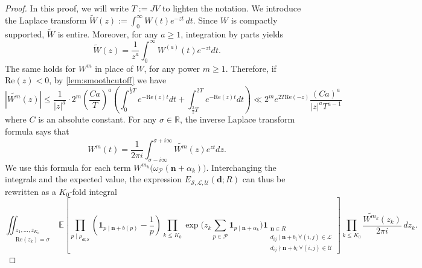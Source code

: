 \documentclass[11pt]{amsart}
\theoremstyle{definition}
\renewcommand{\leq}{\leqslant}
\renewcommand{\geq}{\geqslant}
\renewcommand{\Re}{\mathrm{Re}}
\newcommand{\ind}[1]{\mathbf{1}_{#1}}
\newcommand{\R}{\mathbb{R}}
\newcommand{\primes}{\mathcal{P}}
\renewcommand{\d}{\boldsymbol{d}}
\newcommand{\pcomp}[2]{d_{#1#2}}
\newcommand{\n}{\mathbf{n}}
\newcommand{\curlyL}{V}
\newcommand{\sommespart}{b}
\newcommand{\fprod}[1]{\rho_{#1}}
\newcommand{\lit}{\mathcal{L}}
\newcommand{\unlit}{\mathcal{U}}
\newcommand{\s}{\mathcal{S}}
\newcommand{\repR}{J}
\newcommand{\otherL}{T}
\newcommand{\littleh}{k}
\begin{document}
\begin{proof}
In this proof, we will write $\otherL := \repR \curlyL$ to lighten the notation. We introduce the Laplace transform $\widetilde{W}(z) := \int_0^{\infty} W(t) e^{-zt} \, dt$. Since $W$ is compactly supported, $\widetilde{W}$ is entire. Moreover, for any $a\geq 1$, integration by parts yields
\begin{equation*}
\widetilde{W}(z) =\frac{1}{z^a} \int_0^{\infty} W^{(a)} (t) e^{-zt} dt.
\end{equation*}
The same holds for $W^m$ in place of $W$, for any power $m\geq 1$. Therefore, if $\Re(z) < 0$, by \cref{lem:smoothcutoff} we have
\begin{equation}
\label{eq:derivativeboundLaplace}
|\widetilde{W^m}(z)| \leq \frac{1}{|z|^a}\cdot 2^m \left( \frac{Ca}{\otherL} \right)^a \left( \int_0^{\tfrac12\otherL}  e^{-\Re(z) t} dt +\int_{\tfrac32\otherL}^{2\otherL}  e^{-\Re(z) t} dt \right) \ll 2^m  e^{2\otherL \Re(-z)} \frac{(Ca)^a}{|z|^a \otherL^{a-1}}
\end{equation}
where $C$ is an absolute constant. For any $\sigma\in \R$, the inverse Laplace transform formula says that
\begin{equation*}
W^m(t) = \frac{1}{2\pi i}\int_{\sigma - i\infty}^{\sigma+i\infty} \widetilde{W^m}(z) e^{zt} dz.
\end{equation*}
We use this formula for each term $W^{m_{\littleh}}\big(\omega_{\primes}(\n+\alpha_{\littleh})\big)$. Interchanging the integrals and the expected value, the expression $E_{\s,\lit,\unlit}(\d; R)$ can thus be rewritten as a $K_0$-fold integral 
\begin{equation*}
\iint_{\substack{z_1,\dots,z_{K_0}\\ \Re(z_{\littleh})=\sigma}}  \mathbb{E} \left[ \prod_{p\mid \fprod{\d; \s}} \left(\ind{p\mid \n+\sommespart(p)} - \frac{1}{p} \right)\prod_{\littleh \leq K_0}\exp \bigg(z_{\littleh} \sum_{p\in \primes}\ind{p\mid \n + \alpha_{\littleh}}\bigg) \ind{\substack{\n\in R\qquad\qquad\ \\ \pcomp{i}{j}\mid \n+\sommespart_i \, \forall (i,j)\in \lit \,\\ \pcomp{i}{j}\nmid \n+\sommespart_i \, \forall (i,j)\in \unlit}} \right] \prod_{\littleh \leq K_0} \frac{\widetilde{W^{m_{\littleh}}}(z_{\littleh})}{2\pi i} \, dz_{\littleh}.
\end{equation*}


\end{proof}
\end{document}
